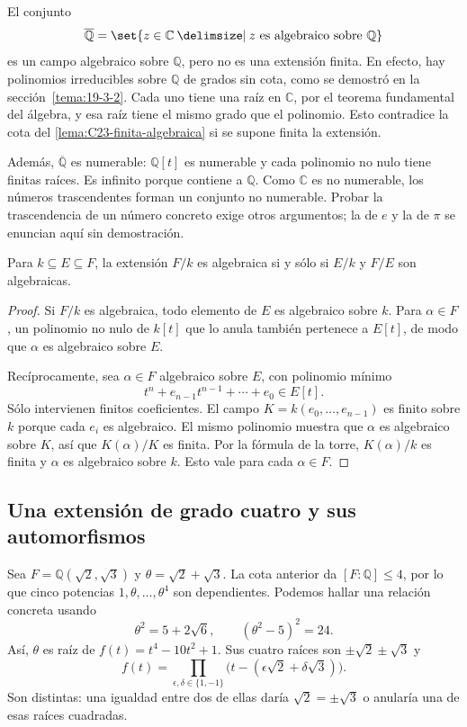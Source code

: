 \begin{ejem}
El conjunto
\[
\overline{\mathbb Q}=\set{z\in\mathbb C\given z\text{ es algebraico sobre }\mathbb Q}
\]
es un campo algebraico sobre $\mathbb Q$, pero no es una extensión finita. En efecto, hay polinomios irreducibles sobre $\mathbb Q$ de grados sin cota, como se demostró en la sección~\ref{tema:19-3-2}. Cada uno tiene una raíz en $\mathbb C$, por el teorema fundamental del álgebra, y esa raíz tiene el mismo grado que el polinomio. Esto contradice la cota del \cref{lema:C23-finita-algebraica} si se supone finita la extensión.

Además, $\overline{\mathbb Q}$ es numerable: $\mathbb Q[t]$ es numerable y cada polinomio no nulo tiene finitas raíces. Es infinito porque contiene a $\mathbb Q$. Como $\mathbb C$ es no numerable, los números trascendentes forman un conjunto no numerable. Probar la trascendencia de un número concreto exige otros argumentos; la de $e$ y la de $\pi$ se enuncian aquí sin demostración.
\end{ejem}

\begin{coro}\label{coro:C23-torre-algebraica}
Para $k\subseteq E\subseteq F$, la extensión $F/k$ es algebraica si y sólo si $E/k$ y $F/E$ son algebraicas.
\end{coro}
\begin{proof}
Si $F/k$ es algebraica, todo elemento de $E$ es algebraico sobre $k$. Para $\alpha\in F$, un polinomio no nulo de $k[t]$ que lo anula también pertenece a $E[t]$, de modo que $\alpha$ es algebraico sobre $E$.

Recíprocamente, sea $\alpha\in F$ algebraico sobre $E$, con polinomio mínimo
\[
t^n+e_{n-1}t^{n-1}+\cdots+e_0\in E[t].
\]
Sólo intervienen finitos coeficientes. El campo $K=k(e_0,\ldots,e_{n-1})$ es finito sobre $k$ porque cada $e_i$ es algebraico. El mismo polinomio muestra que $\alpha$ es algebraico sobre $K$, así que $K(\alpha)/K$ es finita. Por la fórmula de la torre, $K(\alpha)/k$ es finita y $\alpha$ es algebraico sobre $k$. Esto vale para cada $\alpha\in F$.
\end{proof}

\subsection{Una extensión de grado cuatro y sus automorfismos}\label{tema:23-3-0}
Sea $F=\mathbb Q(\sqrt2,\sqrt3)$ y $\theta=\sqrt2+\sqrt3$. La cota anterior da $[F:\mathbb Q]\leq4$, por lo que cinco potencias $1,\theta,\ldots,\theta^4$ son dependientes. Podemos hallar una relación concreta usando
\[
\theta^2=5+2\sqrt6,\qquad (\theta^2-5)^2=24.
\]
Así, $\theta$ es raíz de $f(t)=t^4-10t^2+1$. Sus cuatro raíces son $\pm\sqrt2\pm\sqrt3$ y
\[
f(t)=\prod_{\epsilon,\delta\in\{1,-1\}}
\bigl(t-(\epsilon\sqrt2+\delta\sqrt3)\bigr).
\]
Son distintas: una igualdad entre dos de ellas daría $\sqrt2=\pm\sqrt3$ o anularía una de esas raíces cuadradas.

